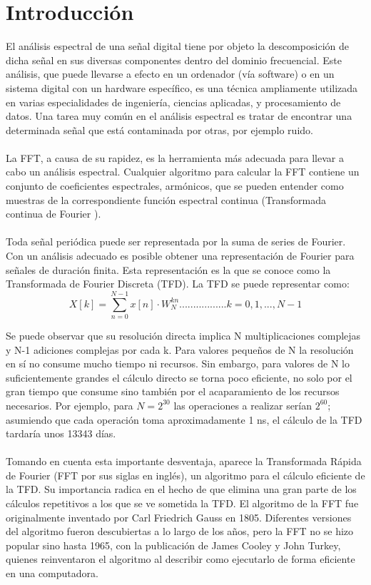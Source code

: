 \documentclass[12pt]{article}
\begin{document}

\newpage

\section{Introducción}
El análisis espectral de una señal digital tiene por objeto la descomposición de dicha señal en sus diversas componentes dentro del dominio frecuencial. Este análisis, que puede llevarse a efecto en un ordenador (vía software) o en un sistema digital con un hardware específico, es una técnica ampliamente utilizada en varias especialidades de ingeniería, ciencias aplicadas, y procesamiento de datos. Una tarea muy común en el análisis espectral es tratar de encontrar una determinada señal que está contaminada por otras, por ejemplo ruido.
\\
\\
La FFT, a causa de su rapidez, es la herramienta más adecuada para llevar a cabo un análisis espectral. Cualquier algoritmo para calcular la FFT contiene un conjunto de coeficientes espectrales, armónicos, que se pueden entender como muestras de la correspondiente función espectral continua (Transformada continua de Fourier ).
\\
\\
Toda señal periódica puede ser representada por la suma de series de Fourier. Con un análisis adecuado es posible obtener una representación de Fourier para señales de duración finita. Esta representación es la que se conoce como la Transformada de Fourier Discreta (TFD). La TFD se puede representar como: 
\begin{equation}
    X[k] = \sum_{n=0}^{N-1} x[n] \cdot W_N^{kn}  .................     k=0,1,..., N-1
\end{equation}

Se puede observar que su resolución directa implica N multiplicaciones complejas y N-1 adiciones complejas por cada k. Para valores pequeños de N la resolución en sí no consume mucho tiempo ni recursos. Sin embargo, para valores de N lo suficientemente grandes el cálculo directo se torna poco eficiente, no solo por el gran tiempo que consume sino también por el acaparamiento de los recursos necesarios. Por ejemplo, para $N = 2^{30}$ las operaciones a realizar serían $2^{60}$; asumiendo que cada operación toma aproximadamente 1 ns, el cálculo de la TFD tardaría unos 13343 días. 
\\
\\
Tomando en cuenta esta importante desventaja, aparece la Transformada Rápida de Fourier (FFT por sus siglas en inglés), un algoritmo para el cálculo eficiente de la TFD. Su importancia radica en el hecho de que elimina una gran parte de los cálculos repetitivos a los que se ve sometida la TFD. El algoritmo de la FFT fue originalmente inventado por Carl Friedrich Gauss en 1805. Diferentes versiones del algoritmo fueron descubiertas a lo largo de los años, pero la FFT no se hizo popular sino hasta 1965, con la publicación de James Cooley y John Turkey, quienes reinventaron el algoritmo al describir como ejecutarlo de forma eficiente en una computadora.
\end{document}
